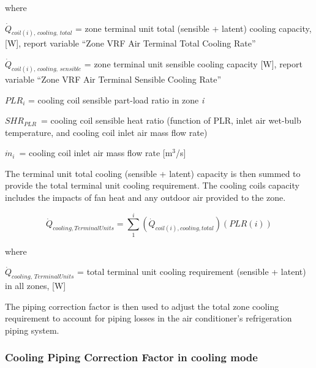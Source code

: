 where

\(\dot{Q}_{coil(i),\,cooling,\,total}\) = zone terminal unit total (sensible + latent) cooling capacity, [W], report variable ``Zone VRF Air Terminal Total Cooling Rate''

\(\dot{Q}_{coil(i),\,cooling,\,sensible}\) = zone terminal unit sensible cooling capacity [W], report variable ``Zone VRF Air Terminal Sensible Cooling Rate''

\(PLR_i\) = cooling coil sensible part-load ratio in zone \emph{i}

\(SHR_{PLR}\) = cooling coil sensible heat ratio (function of PLR, inlet air wet-bulb temperature, and cooling coil inlet air mass flow rate)

\(\dot{m}_{i}\) = cooling coil inlet air mass flow rate [m\(^3\)/s]

The terminal unit total cooling (sensible + latent) capacity is then summed to provide the total terminal unit cooling requirement. The cooling coils capacity includes the impacts of fan heat and any outdoor air provided to the zone.

\begin{equation}
  \dot{Q}_{cooling,TerminalUnits} = \sum\limits_1^i \left( \dot{Q}_{coil(i),cooling,total} \right) \left( PLR(i) \right)
\end{equation}

where

\(\dot{Q}_{cooling,\,TerminalUnits}\) = total terminal unit cooling requirement (sensible + latent) in all zones, [W]

The piping correction factor is then used to adjust the total zone cooling requirement to account for piping losses in the air conditioner's refrigeration piping system.

\subsubsection{Cooling Piping Correction Factor in cooling mode}\label{cooling-piping-correction-factor-in-cooling-mode}

